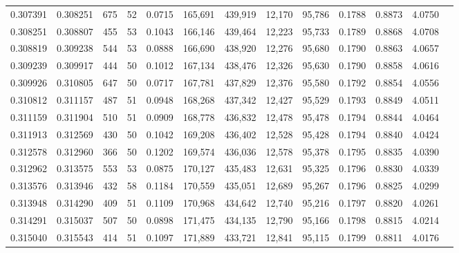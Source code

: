 \begin{tabular}{rrrrrrrrrrrrr}
0.307391 & 0.308251 &   675 &  52 &                                     0.0715 & 165,691 & 439,919 &  12,170 &  95,786 & 0.1788 & 0.8873 & 4.0750 \\
0.308251 & 0.308807 &   455 &  53 &                                     0.1043 & 166,146 & 439,464 &  12,223 &  95,733 & 0.1789 & 0.8868 & 4.0708 \\
0.308819 & 0.309238 &   544 &  53 &                                     0.0888 & 166,690 & 438,920 &  12,276 &  95,680 & 0.1790 & 0.8863 & 4.0657 \\
0.309239 & 0.309917 &   444 &  50 &                                     0.1012 & 167,134 & 438,476 &  12,326 &  95,630 & 0.1790 & 0.8858 & 4.0616 \\
0.309926 & 0.310805 &   647 &  50 &                                     0.0717 & 167,781 & 437,829 &  12,376 &  95,580 & 0.1792 & 0.8854 & 4.0556 \\
0.310812 & 0.311157 &   487 &  51 &                                     0.0948 & 168,268 & 437,342 &  12,427 &  95,529 & 0.1793 & 0.8849 & 4.0511 \\
0.311159 & 0.311904 &   510 &  51 &                                     0.0909 & 168,778 & 436,832 &  12,478 &  95,478 & 0.1794 & 0.8844 & 4.0464 \\
0.311913 & 0.312569 &   430 &  50 &                                     0.1042 & 169,208 & 436,402 &  12,528 &  95,428 & 0.1794 & 0.8840 & 4.0424 \\
0.312578 & 0.312960 &   366 &  50 &                                     0.1202 & 169,574 & 436,036 &  12,578 &  95,378 & 0.1795 & 0.8835 & 4.0390 \\
0.312962 & 0.313575 &   553 &  53 &                                     0.0875 & 170,127 & 435,483 &  12,631 &  95,325 & 0.1796 & 0.8830 & 4.0339 \\
0.313576 & 0.313946 &   432 &  58 &                                     0.1184 & 170,559 & 435,051 &  12,689 &  95,267 & 0.1796 & 0.8825 & 4.0299 \\
0.313948 & 0.314290 &   409 &  51 &                                     0.1109 & 170,968 & 434,642 &  12,740 &  95,216 & 0.1797 & 0.8820 & 4.0261 \\
0.314291 & 0.315037 &   507 &  50 &                                     0.0898 & 171,475 & 434,135 &  12,790 &  95,166 & 0.1798 & 0.8815 & 4.0214 \\
0.315040 & 0.315543 &   414 &  51 &                                     0.1097 & 171,889 & 433,721 &  12,841 &  95,115 & 0.1799 & 0.8811 & 4.0176 \\

\end{tabular}
